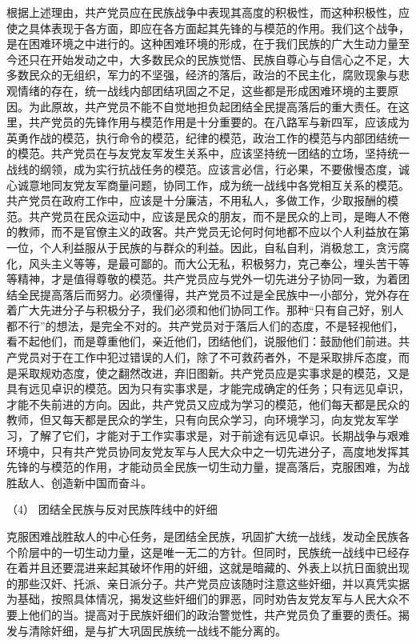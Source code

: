 \documentclass[UTF8, 12pt, a4paper]{ctexrep}
\begin{document}
根据上述理由，共产党员应在民族战争中表现其高度的积极性，而这种积极性，应使之具体表现于各方面，即应在各方面起其先锋的与模范的作用。我们这个战争，是在困难环境之中进行的。这种困难环境的形成，在于我们民族的广大生动力量至今还只在开始发动之中，大多数民众的民族觉悟、民族自尊心与自信心之不足，大多数民众的无组织，军力的不坚强，经济的落后，政治的不民主化，腐败现象与悲观情绪的存在，统一战线内部团结巩固之不足，这些都是形成困难环境的主要原因。为此原故，共产党员不能不自觉地担负起团结全民提高落后的重大责任。在这里，共产党员的先锋作用与模范作用是十分重要的。在八路军与新四军，应该成为英勇作战的模范，执行命令的模范，纪律的模范，政治工作的模范与内部团结统一的模范。共产党员在与友党友军发生关系中，应该坚持统一团结的立场，坚持统一战线的纲领，成为实行抗战任务的模范。应该言必信，行必果，不要傲慢态度，诚心诚意地同友党友军商量问题，协同工作，成为统一战线中各党相互关系的模范。共产党员在政府工作中，应该是十分廉洁，不用私人，多做工作，少取报酬的模范。共产党员在民众运动中，应该是民众的朋友，而不是民众的上司，是晦人不倦的教师，而不是官僚主义的政客。共产党员无论何时何地都不应以个人利益放在第一位，个人利益服从于民族的与群众的利益。因此，自私自利，消极怠工，贪污腐化，风头主义等等，是最可鄙的。而大公无私，积极努力，克己奉公，埋头苦干等等精神，才是值得尊敬的模范。共产党员应与党外一切先进分子协同一致，为着团结全民提高落后而努力。必须懂得，共产党员不过是全民族中一小部分，党外存在着广大先进分子与积极分子，我们必须和他们协同工作。那种“只有自己好，别人都不行”的想法，是完全不对的。共产党员对于落后人们的态度，不是轻视他们，看不起他们，而是尊重他们，亲近他们，团结他们，说服他们：鼓励他们前进。共产党员对于在工作中犯过错误的人们，除了不可救药者外，不是采取排斥态度，而是采取规劝态度，使之翻然改进，弃旧图新。共产党员应是实事求是的模范，又是具有远见卓识的模范。因为只有实事求是，才能完成确定的任务；只有远见卓识，才能不失前进的方向。因此，共产党员又应成为学习的模范，他们每天都是民众的教师，但又每天都是民众的学生，只有向民众学习，向环境学习，向友党友军学习，了解了它们，才能对于工作实事求是，对于前途有远见卓识。长期战争与艰难环境中，只有共产党员协同友党友军与人民大众中之一切先进分子，高度地发挥其先锋的与模范的作用，才能动员全民族一切生动力量，提高落后，克服困难，为战胜敌人、创造新中国而奋斗。

（4） 团结全民族与反对民族阵线中的奸细

克服困难战胜敌人的中心任务，是团结全民族，巩固扩大统一战线，发动全民族各个阶层中的一切生动力量，这是唯一无二的方针。但同时，民族统一战线中已经存在着并且还要混进来起其破坏作用的奸细，这就是暗藏的、外表上以抗日面貌出现的那些汉奸、托派、亲日派分子。共产党员应该随时注意这些奸细，并以真凭实据为基础，按照具体情况，揭发这些奸细们的罪恶，同时劝告友党友军与人民大众不要上他们的当。提高对于民族奸细们的政治警觉性，共产党员负了重要的责任。揭发与清除奸细，是与扩大巩固民族统一战线不能分离的。
\end{document}
